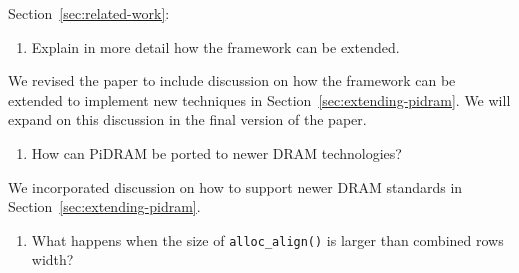 \vspace{5pt}
\yyboxbegin 
{}
\yyboxend 

Section~\ref{sec:related-work}:

\vspace{5pt}
\yyboxbegin 
{}
\yyboxend 

\newpage
\bigbreak
\begin{tcolorbox}
    \begin{enumerate}[label=R5/\arabic*]
        \addtocounter{enumi}{2}
        \item \label{q:r5q3} Explain in more detail how the framework can be extended.
    \end{enumerate}
\end{tcolorbox} 

We revised the paper to include discussion on how the framework can be extended to implement new techniques in Section~\ref{sec:extending-pidram}.  We will expand on this discussion in the final version of the paper. 

\bigbreak
\begin{tcolorbox}
    \begin{enumerate}[label=R5/\arabic*]
        \addtocounter{enumi}{3}
        \item \label{q:r5q4} How can PiDRAM be ported to newer DRAM technologies?
    \end{enumerate}
\end{tcolorbox} 

We incorporated discussion on how to support newer DRAM standards in Section~\ref{sec:extending-pidram}. 

\vspace{5pt}
\yyboxbegin 
{}
\yyboxend 

\bigbreak
\begin{tcolorbox}
    \begin{enumerate}[label=R5/\arabic*]
        \addtocounter{enumi}{4}
        \item \label{q:r5q5} What happens when the size of \texttt{alloc\_align()} is larger than combined rows width? 
    \end{enumerate}
\end{tcolorbox} 

